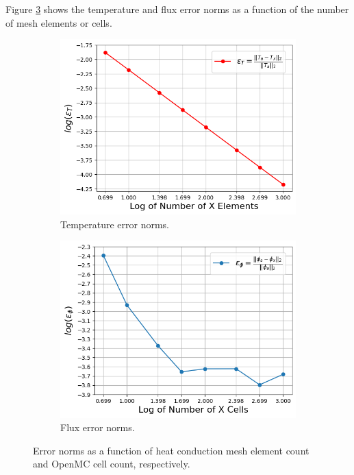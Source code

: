 \documentclass[letterpaper]{mc2023}
\begin{document}
Figure \ref{fig:error_study} shows the temperature and flux error norms as a function of the number of mesh elements or cells.
\begin{figure}[H]
    \centering
    \begin{subfigure}{0.395\linewidth}
        \includegraphics[width=\linewidth]{figures/temp_error_norms.png}
        \caption{Temperature error norms.}
        \label{fig:temp_err}
    \end{subfigure}
    \begin{subfigure}{0.395\linewidth}
        \includegraphics[width=\linewidth]{figures/flux_error_norms.png}
        \caption{Flux error norms.}
        \label{fig:flux_err}
    \end{subfigure}
    \par\bigskip
    \caption{Error norms as a function of heat conduction mesh element count and OpenMC cell count, respectively.}
    \label{fig:error_study}
\end{figure}
\end{document}
